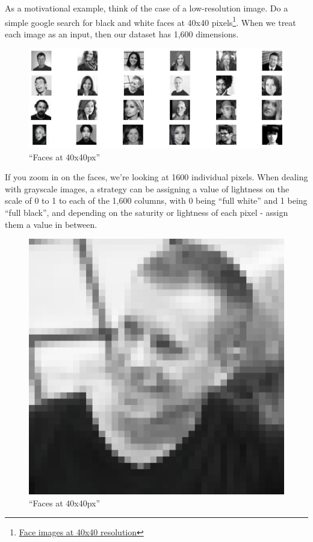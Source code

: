\documentclass[]{article}
\begin{document}
As a motivational example, think of the case of a low-resolution image.
Do a simple google search for black and white faces at 40x40
pixels\footnote{\href{https://www.google.co.id/search?q=face\&as_st=y\&hl=en\&tbas=0\&tbs=ic:gray,isz:ex,iszw:40,iszh:40,itp:photo\&tbm=isch\&source=lnt\&sa=X\&ved=0ahUKEwi29vqT-eHaAhULs48KHVD_AUgQpwUIHg\&biw=1306\&bih=632\&dpr=1.8}{Face
  images at 40x40 resolution}}. When we treat each image as an input,
then our dataset has 1,600 dimensions.

\begin{figure}
\centering
\includegraphics{assets/face.png}
\caption{``Faces at 40x40px''}
\end{figure}

If you zoom in on the faces, we're looking at 1600 individual pixels.
When dealing with grayscale images, a strategy can be assigning a value
of lightness on the scale of 0 to 1 to each of the 1,600 columns, with 0
being ``full white'' and 1 being ``full black'', and depending on the
saturity or lightness of each pixel - assign them a value in between.

\begin{figure}
\centering
\includegraphics{assets/face1.png}
\caption{``Faces at 40x40px''}
\end{figure}
\end{document}
